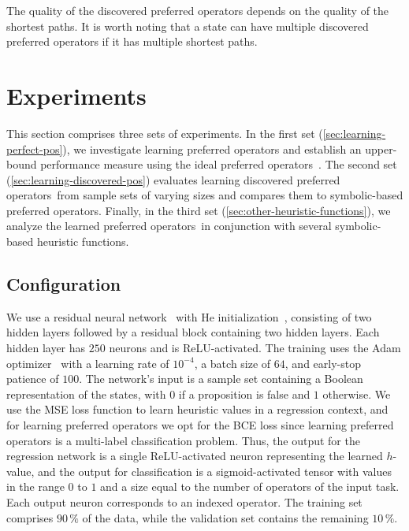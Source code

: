 \documentclass[ppgc,diss,english]{iiufrgs}
\begin{document}
The quality of the discovered preferred operators depends on the quality of the shortest paths. It is worth noting that a state can have multiple discovered preferred operators if it has multiple shortest paths.


%
%
\chapter{Experiments}
This section comprises three sets of experiments. In the first set (\cref{sec:learning-perfect-pos}), we investigate learning preferred operators and establish an upper-bound performance measure using the ideal preferred operators~\postar. The second set (\cref{sec:learning-discovered-pos}) evaluates learning discovered preferred operators~\pog from sample sets of varying sizes and compares them to symbolic-based preferred operators. Finally, in the third set (\cref{sec:other-heuristic-functions}), we analyze the learned preferred operators~\pog in conjunction with several symbolic-based heuristic functions.

\section{Configuration}
We use a residual neural network~\cite{He.etal/2016} with He initialization~\cite{He.etal/2015}, consisting of two hidden layers followed by a residual block containing two hidden layers.
Each hidden layer has $250$ neurons and is ReLU-activated.
The training uses the Adam optimizer~\cite{Kingma.Ba/2015} with a learning rate of $10^{-4}$, a batch size of $64$, and early-stop patience of $100$.
The network's input is a sample set containing a Boolean representation of the states, with $0$ if a proposition is false and $1$ otherwise.
We use the MSE loss function to learn heuristic values in a regression context, and for learning preferred operators we opt for the BCE loss since learning preferred operators is a multi-label classification problem.
Thus, the output for the regression network is a single ReLU-activated neuron representing the learned $h$-value, and the output for classification is a sigmoid-activated tensor with values in the range $0$ to $1$ and a size equal to the number of operators of the input task.
Each output neuron corresponds to an indexed operator. The training set comprises $90\,\%$ of the data, while the validation set contains the remaining $10\,\%$.
\end{document}
